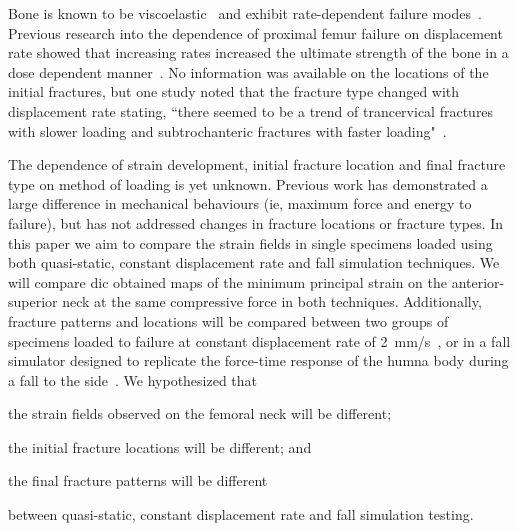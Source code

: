 \sloppy
Bone is known to be viscoelastic~\citep{carter_compressive_1977, mcelhaney_dynamic_1966, crowninshield_response_1974, linde_mechanical_1991} and exhibit rate-dependent failure modes~\citep{mcelhaney_dynamic_1966, crowninshield_response_1974, carter_compressive_1977}.
Previous research into the dependence of proximal femur failure on displacement rate showed that increasing rates increased the ultimate strength of the bone in a dose dependent manner~\citep{courtney_effects_1994, weber_proximal_1992}.
No information was available on the locations of the initial fractures, but one study noted that the fracture type changed with displacement rate stating, ``there seemed to be a trend of trancervical fractures with slower loading and subtrochanteric fractures with faster loading"~\citep{weber_proximal_1992}.
\fussy

The dependence of strain development, initial fracture location and final fracture type on method of loading is yet unknown.
Previous work has demonstrated a large difference in mechanical behaviours (\ac{ie}, maximum force and energy to failure), but has not addressed changes in fracture locations or fracture types.
In this paper we aim to compare the strain fields in single specimens loaded using both quasi-static, constant displacement rate and fall simulation techniques.
We will compare \acf{dic} obtained maps of the minimum principal strain on the anterior-superior neck at the same compressive force in both techniques.
Additionally, fracture patterns and locations will be compared between two groups of specimens loaded to failure at constant displacement rate of 2~\ac{mm}/\ac{s}~\citep{nishiyama_proximal_2013}, or in a fall simulator designed to replicate the force-time response of the humna body during a fall to the side~\citep{gilchrist_development_2013}.
We hypothesized that
\begin{inparaenum}[(i)]
\item the strain fields observed on the femoral neck will be different;
\item the initial fracture locations will be different; and
\item the final fracture patterns will be different
\end{inparaenum}
between quasi-static, constant displacement rate and fall simulation testing.

